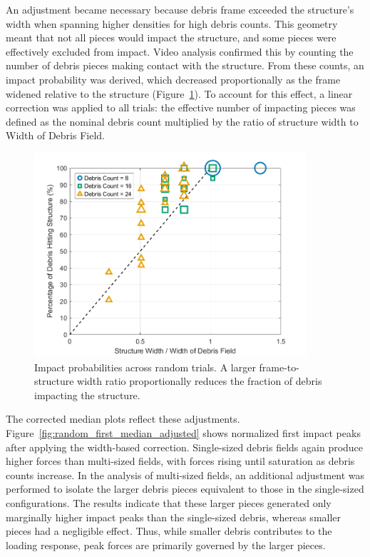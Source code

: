 \documentclass{article}
\begin{document}
{An adjustment became necessary because debris frame exceeded the structure’s width when spanning higher densities for high debris counts. This geometry meant that not all pieces would impact the structure, and some pieces were effectively excluded from impact. Video analysis confirmed this by counting the number of debris pieces making contact with the structure. From these counts, an impact probability was derived, which decreased proportionally as the frame widened relative to the structure (Figure~\ref{fig:impact_probabilities}). To account for this effect, a linear correction was applied to all trials: the effective number of impacting pieces was defined as the nominal debris count multiplied by the ratio of structure width to Width of Debris Field. 

\begin{figure}[htbp]
    \centering
    \includegraphics[width=0.9\textwidth]{Impact_probabilities.png}
    \caption{Impact probabilities across random trials. A larger frame-to-structure width ratio proportionally reduces the fraction of debris impacting the structure.}
    \label{fig:impact_probabilities}
\end{figure}

The corrected median plots reflect these adjustments. Figure~\ref{fig:random_first_median_adjusted} shows normalized first impact peaks after applying the width-based correction. Single-sized debris fields again produce higher forces than multi-sized fields, with forces rising until saturation as debris counts increase. In the analysis of multi-sized fields, an additional adjustment was performed to isolate the larger debris pieces equivalent to those in the single-sized configurations. The results indicate that these larger pieces generated only marginally higher impact peaks than the single-sized debris, whereas smaller pieces had a negligible effect. Thus, while smaller debris contributes to the loading response, peak forces are primarily governed by the larger pieces.

}
\end{document}
